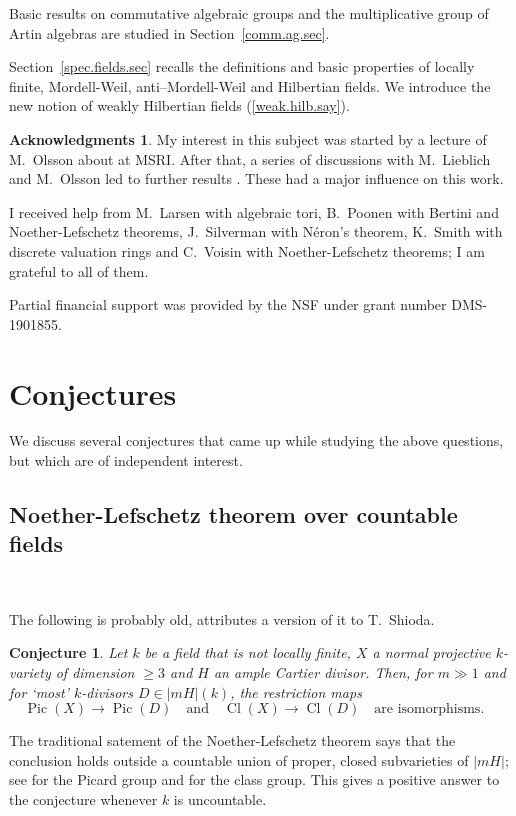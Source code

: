 \documentclass{amsart}
\newtheorem{conj}[thm]{Conjecture}
\theoremstyle{definition}
\newtheorem*{ack}{Acknowledgments}      %
\theoremstyle{remark}
\newcommand{\qtq}[1]{\quad\mbox{#1}\quad}
\newcommand{\pic}[0]{\operatorname{Pic}}
\newcommand{\cl}[0]{\operatorname{Cl}}
\begin{document}
Basic results on commutative algebraic groups and the multiplicative group of
Artin algebras are studied in Section~\ref{comm.ag.sec}.


Section~\ref{spec.fields.sec} recalls the definitions and basic properties of 
locally finite, Mordell-Weil, anti--Mordell-Weil and Hilbertian fields.
We introduce the new notion of weakly Hilbertian fields  (\ref{weak.hilb.say}). 


\begin{ack} My interest in this subject was started by a lecture of M.~Olsson about \cite{k-lo} at MSRI. After that, a series of  discussions with M.~Lieblich and  M.~Olsson led to further results \cite{k-lo-2}. These had a major influence on this work.


I received help from  M.~Larsen  with algebraic tori, B.~Poonen  with Bertini and Noether-Lefschetz theorems, J.~Silverman with N\'eron's theorem, 
K.~Smith     with discrete valuation rings and C.~Voisin with Noether-Lefschetz theorems; I am grateful to all of them.

Partial  financial support    was provided  by  the NSF under grant number
DMS-1901855.
\end{ack}



\section{Conjectures}


We discuss several  conjectures that came up while studying the above questions, but which are of independent interest. 


\subsection*{Noether-Lefschetz theorem over countable fields}{\ }
\medskip

The following is probably  old, \cite{terasoma} attributes a version of it to T.~Shioda.

\begin{conj} \label{Noether-Lefschetz.conj}
Let $k$ be a field that is not locally finite, $X$ a normal projective $k$-variety of dimension $\geq 3$ and $H$ an ample Cartier divisor. Then, for $m\gg 1$ and for
`most' $k$-divisors  $D\in |mH|(k)$, the restriction maps
$$
\pic(X)\to \pic(D)\qtq{and} \cl(X)\to \cl(D) \qtq{are isomorphisms.}
$$
\end{conj}

The traditional satement of the Noether-Lefschetz theorem says
that the conclusion holds outside a countable union of
proper, closed subvarieties of $|mH|$; see \cite{sga2} for the Picard group and  \cite{MR2219849, MR2567426, ji-tocome} for the class group.
This gives a positive answer to the conjecture whenever  $k$ is uncountable.
\end{document}
